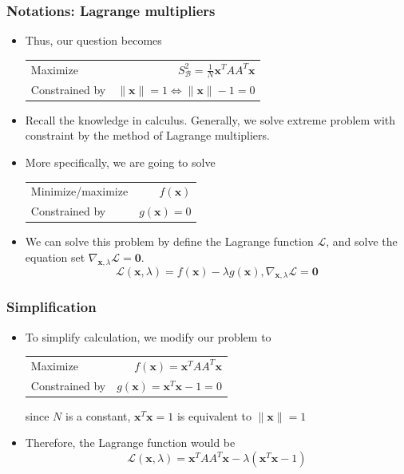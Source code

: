 \documentclass[serif]{beamer}
\begin{document}
\begin{frame}
    \frametitle{Notations: Lagrange multipliers}
    \begin{itemize}
        \item Thus, our question becomes
        \begin{center}
            \centering
            \begin{tabular}{lr}
                Maximize & $S^2_\mathcal{B} = \frac{1}{N}\mathbf{x}^TAA^T\mathbf{x}$\\
                Constrained by & $\|\mathbf{x}\| = 1 \Leftrightarrow \|\mathbf{x}\| - 1 = 0$
            \end{tabular}
        \end{center}
        \item Recall the knowledge in calculus. Generally, we solve extreme problem with constraint by the method of \alert{Lagrange multipliers}.
        \item More specifically, we are going to solve
        \begin{center}
            \centering
            \begin{tabular}{lr}
                Minimize/maximize & $f(\mathbf{x})$\\
                Constrained by & $g(\mathbf{x}) = 0$
            \end{tabular}
        \end{center}
        \item We can solve this problem by define the Lagrange function $\mathcal{L}$, and solve the equation set $\nabla_{\mathbf{x},\lambda}\mathcal{L}=\mathbf{0}$.
        $$
        \mathcal{L}(\mathbf{x}, \lambda) = f(\mathbf{x}) - \lambda g(\mathbf{x}), \nabla_{\mathbf{x},\lambda}\mathcal{L}=\mathbf{0}
        $$
    \end{itemize}
\end{frame}

\begin{frame}
    \frametitle{Simplification}
    \begin{itemize}
        \item To simplify calculation, we modify our problem to
        \begin{center}
            \centering
            \begin{tabular}{lr}
                Maximize & $f(\mathbf{x}) = \mathbf{x}^TAA^T\mathbf{x}$\\
                Constrained by & $g(\mathbf{x}) = \mathbf{x}^T\mathbf{x} - 1 = 0$
            \end{tabular}
        \end{center}
        since $N$ is a constant, $\mathbf{x}^T\mathbf{x} = 1$ is equivalent to $\|\mathbf{x}\|=1$
        \item Therefore, the Lagrange function would be
        $$
        \mathcal{L}(\mathbf{x}, \lambda) = \mathbf{x}^TAA^T\mathbf{x} - \lambda(\mathbf{x}^T\mathbf{x} - 1)
        $$
    \end{itemize}
\end{frame}
\end{document}
